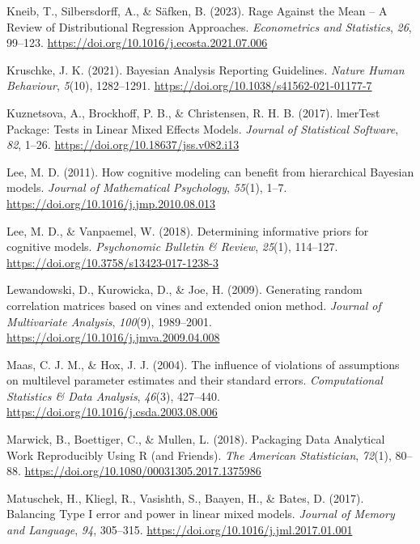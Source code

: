 \documentclass[
  doc,12pt,floatsintext]{apa7}
\newlength{\cslhangindent}
\newenvironment{CSLReferences}[2] %
 {\begin{list}{}{%
  \setlength{\itemindent}{0pt}
  \setlength{\leftmargin}{0pt}
  \setlength{\parsep}{0pt}
  \ifodd #1
   \setlength{\leftmargin}{\cslhangindent}
   \setlength{\itemindent}{-1\cslhangindent}
  \fi
  \setlength{\itemsep}{#2\baselineskip}}}
 {\end{list}}
\begin{document}
\begin{CSLReferences}{1}{0}
Kneib, T., Silbersdorff, A., \& Säfken, B. (2023). Rage {Against} the {Mean} -- {A Review} of {Distributional Regression Approaches}. \emph{Econometrics and Statistics}, \emph{26}, 99--123. \url{https://doi.org/10.1016/j.ecosta.2021.07.006}

Kruschke, J. K. (2021). Bayesian {Analysis Reporting Guidelines}. \emph{Nature Human Behaviour}, \emph{5}(10), 1282--1291. \url{https://doi.org/10.1038/s41562-021-01177-7}

Kuznetsova, A., Brockhoff, P. B., \& Christensen, R. H. B. (2017). {lmerTest Package}: {Tests} in {Linear Mixed Effects Models}. \emph{Journal of Statistical Software}, \emph{82}, 1--26. \url{https://doi.org/10.18637/jss.v082.i13}

Lee, M. D. (2011). How cognitive modeling can benefit from hierarchical {Bayesian} models. \emph{Journal of Mathematical Psychology}, \emph{55}(1), 1--7. \url{https://doi.org/10.1016/j.jmp.2010.08.013}

Lee, M. D., \& Vanpaemel, W. (2018). Determining informative priors for cognitive models. \emph{Psychonomic Bulletin \& Review}, \emph{25}(1), 114--127. \url{https://doi.org/10.3758/s13423-017-1238-3}

Lewandowski, D., Kurowicka, D., \& Joe, H. (2009). Generating random correlation matrices based on vines and extended onion method. \emph{Journal of Multivariate Analysis}, \emph{100}(9), 1989--2001. \url{https://doi.org/10.1016/j.jmva.2009.04.008}

Maas, C. J. M., \& Hox, J. J. (2004). The influence of violations of assumptions on multilevel parameter estimates and their standard errors. \emph{Computational Statistics \& Data Analysis}, \emph{46}(3), 427--440. \url{https://doi.org/10.1016/j.csda.2003.08.006}

Marwick, B., Boettiger, C., \& Mullen, L. (2018). Packaging {Data Analytical Work Reproducibly Using R} (and {Friends}). \emph{The American Statistician}, \emph{72}(1), 80--88. \url{https://doi.org/10.1080/00031305.2017.1375986}

Matuschek, H., Kliegl, R., Vasishth, S., Baayen, H., \& Bates, D. (2017). Balancing {Type I} error and power in linear mixed models. \emph{Journal of Memory and Language}, \emph{94}, 305--315. \url{https://doi.org/10.1016/j.jml.2017.01.001}


\end{CSLReferences}
\end{document}
